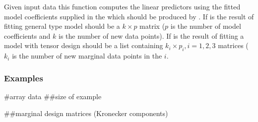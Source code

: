 \documentclass[letterpaper,10pt,english]{sphinxmanual}
\begin{document}
\begin{fulllineitems}
\sphinxAtStartPar
Given input  data this function computes the linear predictors
using the fitted model coefficients supplied in  the  which should be produced by  
. If  is the result of fitting general type model  
 should be a \(k \times p\) matrix (\(p\) is the number of model
coefficients and \(k\) is the number of new data points). 
If  is the result of fitting a model with tensor design  should be a list containing 
\(k_i \times p_i, i = 1, 2, 3\) matrices 
(\(k_i\) is the number of new marginal data points in the \(i\).
\subsubsection*{Examples}

\sphinxAtStartPar
\#array data 
\#\#size of example

\begin{sphinxVerbatim}[commandchars=\\\{\}]
   
  \PYG{p}{[}  \PYG{p}{]}
  \PYG{p}{[}  \PYG{p}{]}
\end{sphinxVerbatim}

\sphinxAtStartPar
\#\#marginal design matrices (Kronecker components)

\begin{sphinxVerbatim}[commandchars=\\\{\}]
  \PYG{p}{[}\PYG{p}{]}   
   
\PYG{p}{[}\PYG{p}{]}    \PYG{p}{[}\PYG{p}{]} \PYG{p}{[}\PYG{p}{]}
\end{sphinxVerbatim}


\end{fulllineitems}
\end{document}
